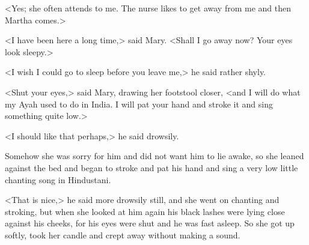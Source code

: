 <Yes; she often attends to me. The nurse likes to get away from me and then Martha comes.>

<I have been here a long time,> said Mary. <Shall I go away now? Your eyes look sleepy.>

<I wish I could go to sleep before you leave me,> he said rather shyly.

<Shut your eyes,> said Mary, drawing her footstool closer, <and I will do what my Ayah used to do in India. I will pat your hand and stroke it and sing something quite low.>

<I should like that perhaps,> he said drowsily.

Somehow she was sorry for him and did not want him to lie awake, so she leaned against the bed and began to stroke and pat his hand and sing a very low little chanting song in Hindustani.

<That is nice,> he said more drowsily still, and she went on chanting and stroking, but when she looked at him again his black lashes were lying close against his cheeks, for his eyes were shut and he was fast asleep. So she got up softly, took her candle and crept away without making a sound.